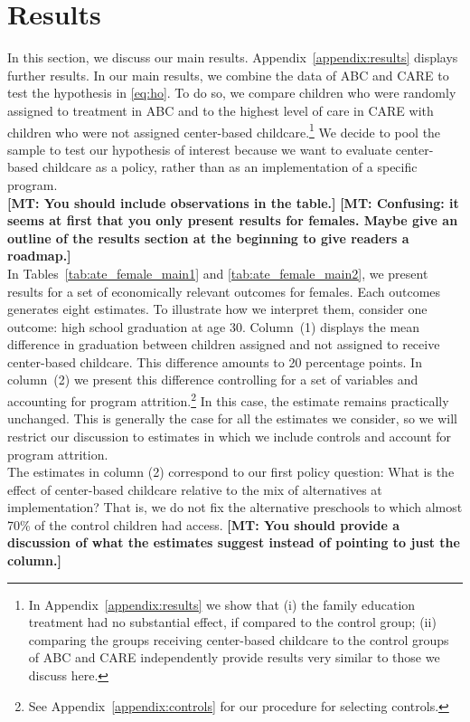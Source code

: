 \section{Results} \label{section:results}

\noindent In this section, we discuss our main results. Appendix~\ref{appendix:results} displays further results. In our main results, we combine the data of ABC and CARE to test the hypothesis in \eqref{eq:ho}. To do so, we compare children who were randomly assigned to treatment in ABC and to the highest level of care in CARE with children who were not assigned center-based childcare.\footnote{In Appendix~\ref{appendix:results} we show that (i) the family education treatment had no substantial effect, if compared to the control group; (ii) comparing the groups receiving center-based childcare to the control groups of ABC and CARE independently provide results very similar to those we discuss here.} We decide to pool the sample to test our hypothesis of interest because we want to evaluate center-based childcare as a policy, rather than as an implementation of a specific program.\\

\textbf{[MT: You should include observations in the table.]}
\textbf{[MT: Confusing: it seems at first that you only present results for females. Maybe give an outline of the results section at the beginning to give readers a roadmap.]} \\

\noindent In Tables~\ref{tab:ate_female_main1} and \ref{tab:ate_female_main2}, we present results for a set of economically relevant outcomes for females. Each outcomes generates eight estimates. To illustrate how we interpret them, consider one outcome: high school graduation at age 30. Column~(1) displays the mean difference in graduation between children assigned and not assigned to receive center-based childcare. This difference amounts to 20 percentage points. In column~(2) we present this difference controlling for a set of variables and accounting for program attrition.\footnote{See Appendix~\ref{appendix:controls} for our procedure for selecting controls.} In this case, the estimate remains practically unchanged. This is generally the case for all the estimates we consider, so we will restrict our discussion to estimates in which we include controls and account for program attrition.\\

\noindent The estimates in column (2) correspond to our first policy question: What is the effect of center-based childcare relative to the mix of alternatives at implementation? That is, we do not fix the alternative preschools to which almost 70\% of the control children had access. \textbf{[MT: You should provide a discussion of what the estimates suggest instead of pointing to just the column.]} \\

